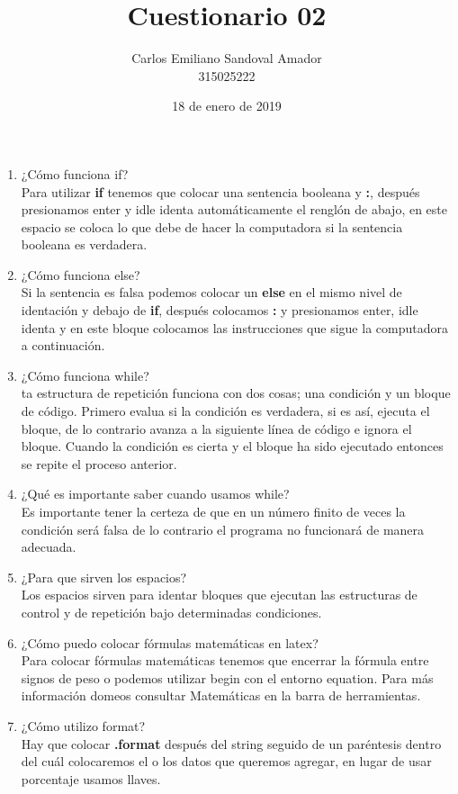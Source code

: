 \documentclass[letterpaper, 12pt, oneside]{article}%
\title{Cuestionario 02}
\author{Carlos Emiliano Sandoval Amador \\ 315025222}
\date{18 de enero de 2019}
\begin{document}
	\maketitle
	\begin{enumerate}
		\item ¿Cómo funciona if? \\ Para utilizar \textbf{if} tenemos que colocar una sentencia booleana y \textbf{:}, después presionamos enter y idle identa automáticamente el renglón de abajo, en este espacio se coloca lo que debe de hacer la computadora si la sentencia booleana es verdadera.
		\item ¿Cómo funciona else? \\ Si la sentencia es falsa podemos colocar un \textbf{else} en el mismo nivel de identación y debajo de \textbf{if}, después colocamos \textbf{:} y presionamos enter, idle identa y en este bloque colocamos las instrucciones que sigue la computadora a continuación.
		\item ¿Cómo funciona while? \\ ta estructura de repetición funciona con dos cosas; una condición y un bloque de código. Primero evalua si la condición es verdadera, si es así, ejecuta el bloque, de lo contrario avanza a la siguiente línea de código e ignora el bloque. Cuando la condición es cierta y el bloque ha sido ejecutado entonces se repite el proceso anterior.
		\item ¿Qué es importante saber cuando usamos while? \\ Es importante tener la certeza de que en un número finito de veces la condición será falsa de lo contrario el programa no funcionará de manera adecuada.
		\item ¿Para que sirven los espacios? \\ Los espacios sirven para identar bloques que ejecutan las estructuras de control y de repetición bajo determinadas condiciones. 
		\item ¿Cómo puedo colocar fórmulas matemáticas en latex? \\ Para colocar fórmulas matemáticas tenemos que encerrar la fórmula entre signos de peso o podemos utilizar begin con el entorno equation. Para más información domeos consultar Matemáticas en la barra de herramientas.
		\item ¿Cómo utilizo format? \\ Hay que colocar \textbf{.format} después del string seguido de un paréntesis dentro del cuál colocaremos el o los datos que queremos agregar, en lugar de usar porcentaje usamos llaves.

\end{enumerate}
\end{document}
